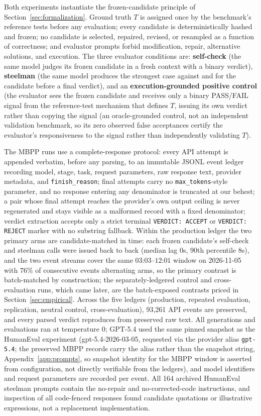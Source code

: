 \documentclass[a4paper,journal]{IAENGtran}
\begin{document}
Both experiments instantiate the frozen-candidate principle of
Section~\ref{sec:formalization}. Ground truth $T$ is assigned once by the benchmark's
reference tests before any evaluation; every candidate is deterministically hashed and
frozen; no candidate is selected, repaired, revised, or resampled as a function of
correctness; and evaluator prompts forbid modification, repair, alternative solutions,
and execution. The three evaluator conditions are: \textbf{self-check} (the same model
judges its frozen candidate in a fresh context with a binary verdict),
\textbf{steelman} (the same model produces the strongest case against and for the
candidate before a final verdict), and an \textbf{execution-grounded positive control}
(the evaluator sees the frozen candidate and receives only a binary PASS/FAIL signal
from the reference-test mechanism that defines $T$, issuing its own verdict rather
than copying the signal (an oracle-grounded control, not an independent validation
benchmark, so its zero observed false acceptances certify the evaluator's
responsiveness to the signal rather than independently validating $T$).

The MBPP runs use a complete-response protocol: every API attempt is appended verbatim,
before any parsing, to an immutable JSONL event ledger recording model, stage, task,
request parameters, raw response text, provider metadata, and \texttt{finish\_reason};
final attempts carry no \texttt{max\_tokens}-style parameter, and no response entering
any denominator is truncated at our behest; a pair whose final attempt reaches the provider's own output ceiling is
never regenerated and stays visible as a malformed record with a fixed denominator;
verdict extraction accepts only a strict terminal \texttt{VERDICT: ACCEPT} or
\texttt{VERDICT: REJECT} marker with no substring fallback. Within the production
ledger the two primary arms are candidate-matched in time: each frozen candidate's
self-check and steelman calls were issued back to back (median lag $0$s, 90th
percentile $8$s), and the two event streams cover the same $03$:$03$--$12$:$01$
window on 2026-11-05 with $76\%$ of consecutive events alternating arms, so the
primary contrast is batch-matched by construction; the separately-ledgered
control and cross-evaluation runs, which came later, are the batch-exposed
contrasts priced in Section~\ref{sec:empirical}. Across the five ledgers
(production, repeated evaluation, replication, neutral control, cross-evaluation),
93,261 API events are preserved, and every parsed verdict reproduces from preserved raw
text. All generations and evaluations ran at temperature 0; GPT-5.4 used the same
pinned snapshot as the HumanEval experiment (gpt-5.4-2026-03-05, requested via the
provider alias \texttt{gpt-5.4}; the preserved MBPP records carry the alias rather
than the snapshot string, Appendix~\ref{app:prompts}, so snapshot identity for the
MBPP window is asserted from configuration, not directly verifiable from the
ledgers), and model identifiers
and request parameters are recorded per event. All 164 archived HumanEval steelman
prompts contain the no-repair and no-corrected-code instructions, and inspection of all
code-fenced responses found candidate quotations or illustrative expressions, not a
replacement implementation.
\end{document}
